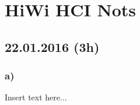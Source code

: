 \documentclass[12pt,a4paper]{article}
\begin{document}
\setlength{\parindent}{0pt}


\section*{HiWi HCI Nots}

\subsection*{22.01.2016 (3h)}

\subsubsection*{a)}
Insert text here...
\end{document}
